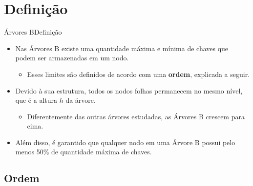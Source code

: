 \documentclass[aspectratio=169]{beamer}
\begin{document}
\section{Definição}

\begin{frame}{Árvores B}{Definição}
\begin{itemize}
\item Nas Árvores B existe uma quantidade máxima e mínima de chaves que podem ser armazenadas em um nodo.
\begin{itemize}
\item  Esses limites são definidos de acordo com uma {\bf ordem}, explicada a seguir.
\end{itemize}
\item Devido à sua estrutura, todos os nodos folhas permanecem no mesmo nível, que é a altura $h$ da árvore.
\begin{itemize}
\item Diferentemente das outras árvores estudadas, as Árvores B crescem para cima.
\end{itemize}
\item Além disso, é garantido que qualquer nodo em uma Árvore B possui pelo menos 50\% de quantidade máxima de chaves.
\end{itemize}
\end{frame}

\subsection{Ordem}
\end{document}
